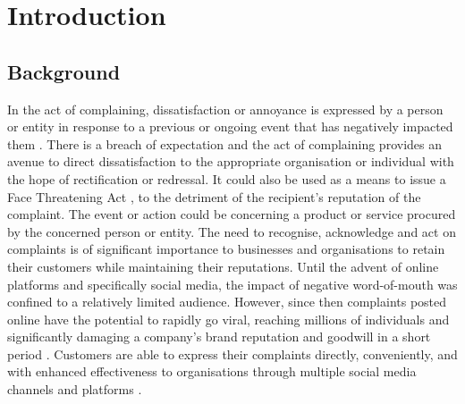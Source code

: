 \chapter{Introduction}

\section{Background}
In the act of complaining, dissatisfaction or annoyance is expressed by a person or entity in response to a previous or ongoing event that has negatively impacted them \cite{olshtain_speechact_1987}. There is a breach of expectation and the act of complaining provides an avenue to direct dissatisfaction to the appropriate organisation or individual with the hope of rectification or redressal. It could also be used as a means to issue a Face Threatening Act \cite{brownPolitenessUniversalsLanguage1987}, to the detriment of the recipient's reputation of the complaint. The event or action could be concerning a product or service procured by the concerned person or entity. The need to recognise, acknowledge and act on complaints is of significant importance to businesses and organisations to retain their customers while maintaining their reputations.
\newline \newline
Until the advent of online platforms and specifically social media, the impact of negative word-of-mouth was confined to a relatively limited audience. However, since then complaints posted online have the potential to rapidly go viral, reaching millions of individuals and significantly damaging a company's brand reputation and goodwill in a short period \cite{tripp_when_2011}. Customers are able to express their complaints directly, conveniently, and with enhanced effectiveness to organisations through multiple social media channels and platforms \cite{balaji_customer_2015}.\newline

